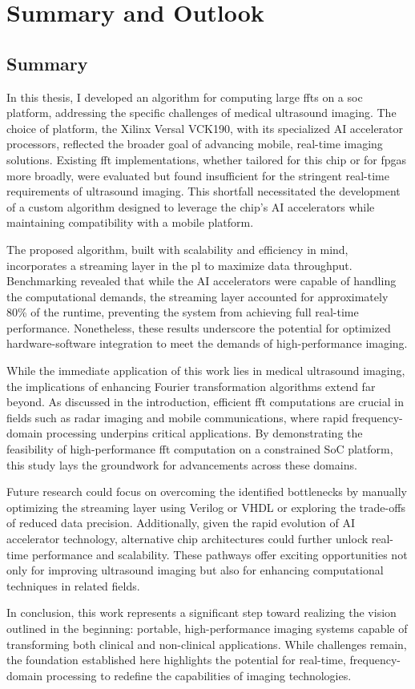\chapter{Summary and Outlook}\label{ch:sum}

\section{Summary}\label{sec:conclusion}
In this thesis, I developed an algorithm for computing large \ac{fft}s on a \ac{soc} platform, addressing the specific challenges of medical ultrasound imaging. The choice of platform, the Xilinx Versal VCK190, with its specialized AI accelerator processors, reflected the broader goal of advancing mobile, real-time imaging solutions. Existing \ac{fft} implementations, whether tailored for this chip or for \ac{fpga}s more broadly, were evaluated but found insufficient for the stringent real-time requirements of ultrasound imaging. This shortfall necessitated the development of a custom algorithm designed to leverage the chip's AI accelerators while maintaining compatibility with a mobile platform.\par
The proposed algorithm, built with scalability and efficiency in mind, incorporates a streaming layer in the \ac{pl} to maximize data throughput. Benchmarking revealed that while the AI accelerators were capable of handling the computational demands, the streaming layer accounted for approximately 80\% of the runtime, preventing the system from achieving full real-time performance. Nonetheless, these results underscore the potential for optimized hardware-software integration to meet the demands of high-performance imaging.\par
While the immediate application of this work lies in medical ultrasound imaging, the implications of enhancing Fourier transformation algorithms extend far beyond. As discussed in the introduction, efficient \ac{fft} computations are crucial in fields such as radar imaging and mobile communications, where rapid frequency-domain processing underpins critical applications. By demonstrating the feasibility of high-performance \ac{fft} computation on a constrained SoC platform, this study lays the groundwork for advancements across these domains.\par
Future research could focus on overcoming the identified bottlenecks by manually optimizing the streaming layer using Verilog or VHDL or exploring the trade-offs of reduced data precision. Additionally, given the rapid evolution of AI accelerator technology, alternative chip architectures could further unlock real-time performance and scalability. These pathways offer exciting opportunities not only for improving ultrasound imaging but also for enhancing computational techniques in related fields.\par
In conclusion, this work represents a significant step toward realizing the vision outlined in the beginning: portable, high-performance imaging systems capable of transforming both clinical and non-clinical applications. While challenges remain, the foundation established here highlights the potential for real-time, frequency-domain processing to redefine the capabilities of imaging technologies.

